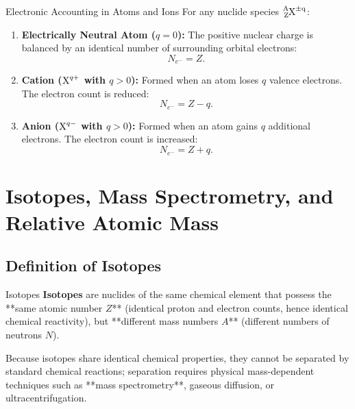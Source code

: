 \begin{lawbox}{Electronic Accounting in Atoms and Ions}
For any nuclide species $\ce{^{A}_{Z}X^{\pm q}}$:
\begin{enumerate}[leftmargin=1.5em,itemsep=3pt]
  \item \textbf{Electrically Neutral Atom ($q = 0$):} The positive nuclear charge is balanced by an identical number of surrounding orbital electrons:
  \begin{equation}
  N_{e^-} = Z.
  \end{equation}
  \item \textbf{Cation ($\ce{X^{q+}}$ with $q > 0$):} Formed when an atom loses $q$ valence electrons. The electron count is reduced:
  \begin{equation}
  N_{e^-} = Z - q.
  \end{equation}
  \item \textbf{Anion ($\ce{X^{q-}}$ with $q > 0$):} Formed when an atom gains $q$ additional electrons. The electron count is increased:
  \begin{equation}
  N_{e^-} = Z + q.
  \end{equation}
\end{enumerate}
\end{lawbox}

\section{Isotopes, Mass Spectrometry, and Relative Atomic Mass}

\subsection{Definition of Isotopes}
\begin{definitionbox}{Isotopes}
\textbf{Isotopes} are nuclides of the same chemical element that possess the **same atomic number $Z$** (identical proton and electron counts, hence identical chemical reactivity), but **different mass numbers $A$** (different numbers of neutrons $N$).
\end{definitionbox}

Because isotopes share identical chemical properties, they cannot be separated by standard chemical reactions; separation requires physical mass-dependent techniques such as **mass spectrometry**, gaseous diffusion, or ultracentrifugation.

